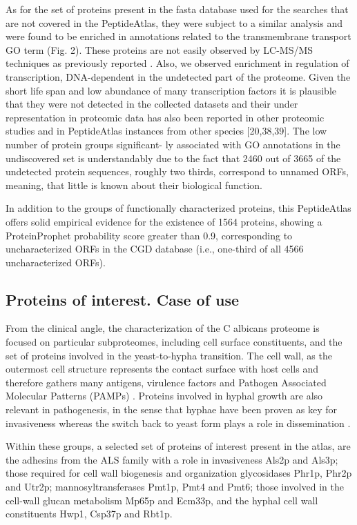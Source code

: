 As for the set of proteins present in the fasta database used
for the searches that are not covered in the PeptideAtlas, they
were subject to a similar analysis and were found to be enriched
in annotations related to the transmembrane transport GO term
(Fig. 2). These proteins are not easily observed by LC-MS/MS
techniques as previously reported \citep{Gunaratne2013b}. Also, we observed
enrichment in regulation of transcription, DNA-dependent in the
undetected part of the proteome. Given the short life span and
low abundance of many transcription factors it is plausible that
they were not detected in the collected datasets and their under
representation in proteomic data has also been reported in other
proteomic studies and in PeptideAtlas instances from other
species [20,38,39]\citep{Gunaratne2013b,Ding2013,Simicevic2013}. 
The low number of protein groups significant-
ly associated with GO annotations in the undiscovered set is
understandably due to the fact that 2460 out of 3665 of the
undetected protein sequences, roughly two thirds, correspond to
unnamed ORFs, meaning, that little is known about their
biological function.

In addition to the groups of functionally characterized proteins,
 this PeptideAtlas offers solid empirical evidence for the
existence of 1564 proteins, showing a ProteinProphet probability
score greater than 0.9, corresponding to uncharacterized ORFs in
the CGD database (i.e., one-third of all 4566 uncharacterized ORFs).


\subsection*{Proteins of interest. Case of use}

From the clinical angle, the characterization of the C albicans
proteome is focused on particular subproteomes, including
cell surface constituents, and the set of proteins involved in
the yeast-to-hypha transition. The cell wall, as the outermost
cell structure represents the contact surface with host cells
and therefore gathers many antigens, virulence factors and
Pathogen Associated Molecular Patterns (PAMPs) \citep{Vialas2012}. Proteins
involved in hyphal growth are also relevant in pathogenesis,
in the sense that hyphae have been proven as key for
invasiveness whereas the switch back to yeast form plays a
role in dissemination \citep{Saville2003}.

Within these groups, a selected set of proteins of interest
present in the atlas, are the adhesins from the ALS family with
a role in invasiveness Als2p and Als3p; those required for cell
wall biogenesis and organization glycosidases Phr1p, Phr2p
and Utr2p; mannosyltransferases Pmt1p, Pmt4 and Pmt6;
those involved in the cell-wall glucan metabolism Mp65p and
Ecm33p, and the hyphal cell wall constituents Hwp1, Csp37p
and Rbt1p.

